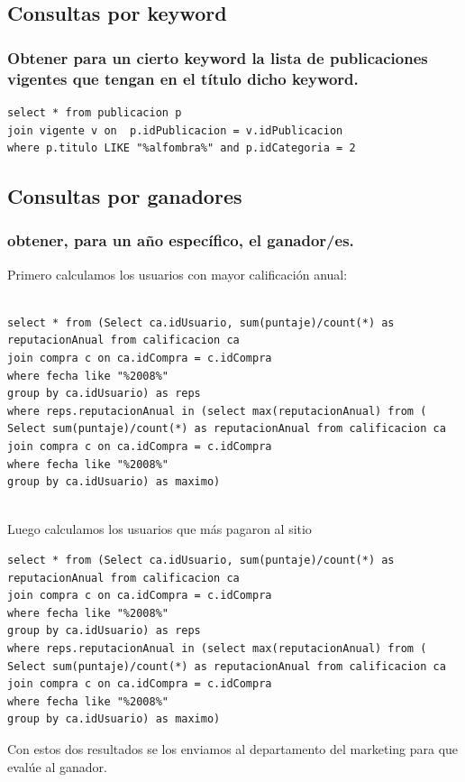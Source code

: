 \documentclass[a4paper, 10pt, twoside]{article}
\begin{document}
\subsection{Consultas por keyword}
\subsubsection{Obtener para un cierto keyword la lista de publicaciones vigentes que tengan en el t\'itulo dicho keyword.}
\begin{verbatim}
select * from publicacion p 
join vigente v on  p.idPublicacion = v.idPublicacion
where p.titulo LIKE "%alfombra%" and p.idCategoria = 2
\end{verbatim}
\newpage
\subsection{Consultas por ganadores}
\subsubsection{ obtener, para un a\~no espec\'ifico, el ganador/es.}
Primero calculamos los usuarios con mayor calificaci\'on anual:
\begin{verbatim}

select * from (Select ca.idUsuario, sum(puntaje)/count(*) as reputacionAnual from calificacion ca
join compra c on ca.idCompra = c.idCompra
where fecha like "%2008%"
group by ca.idUsuario) as reps
where reps.reputacionAnual in (select max(reputacionAnual) from (
Select sum(puntaje)/count(*) as reputacionAnual from calificacion ca
join compra c on ca.idCompra = c.idCompra
where fecha like "%2008%"
group by ca.idUsuario) as maximo)


\end{verbatim}

Luego calculamos los usuarios que m\'as pagaron al sitio
\begin{verbatim}
select * from (Select ca.idUsuario, sum(puntaje)/count(*) as reputacionAnual from calificacion ca
join compra c on ca.idCompra = c.idCompra
where fecha like "%2008%"
group by ca.idUsuario) as reps
where reps.reputacionAnual in (select max(reputacionAnual) from (
Select sum(puntaje)/count(*) as reputacionAnual from calificacion ca
join compra c on ca.idCompra = c.idCompra
where fecha like "%2008%"
group by ca.idUsuario) as maximo)
\end{verbatim}

Con estos dos resultados se los enviamos al departamento del marketing para que eval\'ue al ganador.
\end{document}
